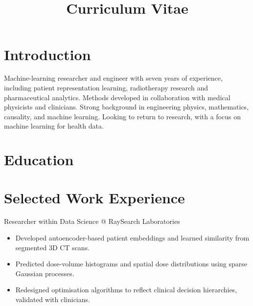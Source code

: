 \documentclass[11pt,a4paper]{moderncv}
\title{Curriculum Vitae}
\begin{document}
\makecvtitle

\section*{Introduction}

Machine-learning researcher and engineer with seven years of experience, including patient representation learning, radiotherapy research and pharmaceutical analytics. Methods developed in collaboration with medical physicists and clinicians. Strong background in engineering physics, mathematics, causality, and machine learning. Looking to return to research, with a focus on machine learning for health data.

\section{Education}





\section{Selected Work Experience}

\large{Researcher within Data Science @ RaySearch Laboratories}
\normalsize
\begin{itemize}
    \item Developed autoencoder-based patient embeddings and learned similarity from segmented 3D CT scans.
    \item Predicted dose-volume histograms and spatial dose distributions using sparse Gaussian processes.
    \item Redesigned optimisation algorithms to reflect clinical decision hierarchies, validated with clinicians.
\end{itemize}
\end{document}
